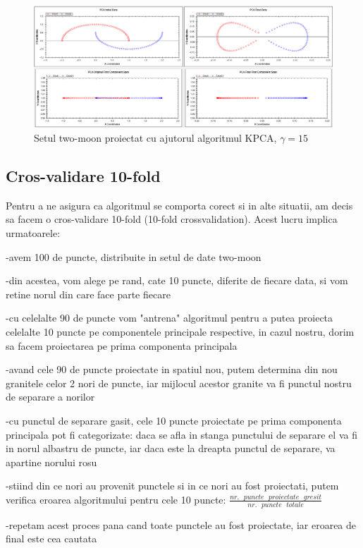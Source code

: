 \documentclass[12pt]{article}
\begin{document}
\begin{figure}[H]
\centering
\caption{Setul two-moon proiectat cu ajutorul algoritmul KPCA, $\gamma =15$}
\includegraphics[width=\linewidth]{twomoon1}
\end{figure}

\subsection{Cros-validare 10-fold}
Pentru a ne asigura ca algoritmul se comporta corect si in alte situatii, am decis sa facem o cros-validare 10-fold (10-fold crossvalidation). Acest lucru implica urmatoarele: 

-avem 100 de puncte, distribuite in setul de date two-moon

-din acestea, vom alege pe rand, cate 10 puncte, diferite de fiecare data, si vom retine norul din care face parte fiecare

-cu celelalte 90 de puncte vom "antrena" algoritmul pentru a putea proiecta celelalte 10 puncte pe componentele principale respective, in cazul nostru, dorim sa facem proiectarea pe prima componenta principala

-avand cele 90 de puncte proiectate in spatiul nou, putem determina din nou granitele celor 2 nori de puncte, iar mijlocul acestor granite va fi punctul nostru de separare a norilor

-cu punctul de separare gasit, cele 10 puncte proiectate pe prima componenta principala pot fi categorizate: daca se afla in stanga punctului de separare el va fi in norul albastru de puncte, iar daca este la dreapta punctul de separare, va apartine norului rosu

-stiind din ce nori au provenit punctele si in ce nori au fost proiectati, putem verifica eroarea algoritmului pentru cele 10 puncte: $\frac{nr. \text { } puncte \text { } proiectate \text { } gresit}{nr. \text { } puncte \text { } totale}$

-repetam acest proces pana cand toate punctele au fost proiectate, iar eroarea de final este cea cautata
\end{document}
